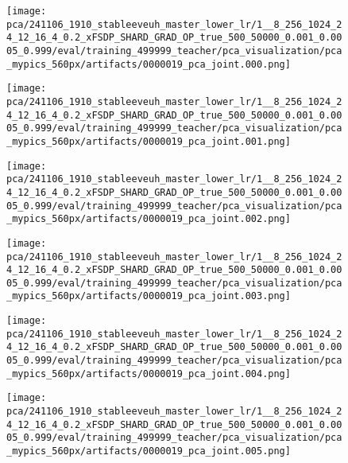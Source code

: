 \begin{figure*}[p]
\begin{subfigure}[t]{0.097\textwidth}
    \end{subfigure}
    \begin{subfigure}[t]{0.097\textwidth}
        \centering
        \texttt{[image: pca/241106\_1910\_stableeveuh\_master\_lower\_lr/1\_\_8\_256\_1024\_24\_12\_16\_4\_0.2\_xFSDP\_SHARD\_GRAD\_OP\_true\_500\_50000\_0.001\_0.0005\_0.999/eval/training\_499999\_teacher/pca\_visualization/pca\_mypics\_560px/artifacts/0000019\_pca\_joint.000.png]}
    \end{subfigure}\hfill
    \begin{subfigure}[t]{0.097\textwidth}
        \centering
        \texttt{[image: pca/241106\_1910\_stableeveuh\_master\_lower\_lr/1\_\_8\_256\_1024\_24\_12\_16\_4\_0.2\_xFSDP\_SHARD\_GRAD\_OP\_true\_500\_50000\_0.001\_0.0005\_0.999/eval/training\_499999\_teacher/pca\_visualization/pca\_mypics\_560px/artifacts/0000019\_pca\_joint.001.png]}
    \end{subfigure}\hfill
    \begin{subfigure}[t]{0.097\textwidth}
        \centering
        \texttt{[image: pca/241106\_1910\_stableeveuh\_master\_lower\_lr/1\_\_8\_256\_1024\_24\_12\_16\_4\_0.2\_xFSDP\_SHARD\_GRAD\_OP\_true\_500\_50000\_0.001\_0.0005\_0.999/eval/training\_499999\_teacher/pca\_visualization/pca\_mypics\_560px/artifacts/0000019\_pca\_joint.002.png]}
    \end{subfigure}\hfill
    \begin{subfigure}[t]{0.097\textwidth}
        \centering
        \texttt{[image: pca/241106\_1910\_stableeveuh\_master\_lower\_lr/1\_\_8\_256\_1024\_24\_12\_16\_4\_0.2\_xFSDP\_SHARD\_GRAD\_OP\_true\_500\_50000\_0.001\_0.0005\_0.999/eval/training\_499999\_teacher/pca\_visualization/pca\_mypics\_560px/artifacts/0000019\_pca\_joint.003.png]}
    \end{subfigure}\hfill
    \begin{subfigure}[t]{0.097\textwidth}
        \centering
        \texttt{[image: pca/241106\_1910\_stableeveuh\_master\_lower\_lr/1\_\_8\_256\_1024\_24\_12\_16\_4\_0.2\_xFSDP\_SHARD\_GRAD\_OP\_true\_500\_50000\_0.001\_0.0005\_0.999/eval/training\_499999\_teacher/pca\_visualization/pca\_mypics\_560px/artifacts/0000019\_pca\_joint.004.png]}
    \end{subfigure}\hfill
    \begin{subfigure}[t]{0.097\textwidth}
        \centering
        \texttt{[image: pca/241106\_1910\_stableeveuh\_master\_lower\_lr/1\_\_8\_256\_1024\_24\_12\_16\_4\_0.2\_xFSDP\_SHARD\_GRAD\_OP\_true\_500\_50000\_0.001\_0.0005\_0.999/eval/training\_499999\_teacher/pca\_visualization/pca\_mypics\_560px/artifacts/0000019\_pca\_joint.005.png]}

\end{subfigure}
\end{figure*}
